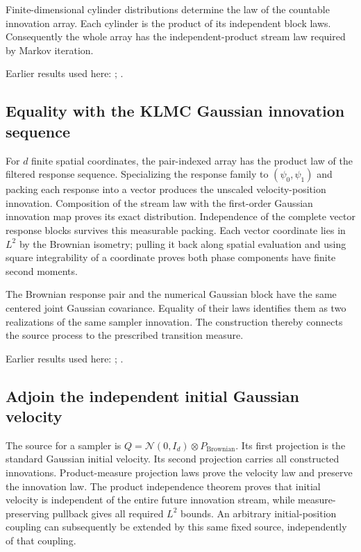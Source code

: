 \documentclass[11pt,a4paper]{report}
\begin{document}
Finite-dimensional cylinder distributions determine the law of the countable innovation array. Each cylinder is the product of its independent block laws. Consequently the whole array has the independent-product stream law required by Markov iteration.



Earlier results used here: \cite[Section~3.8.16]{LangevinLean2026ULASC}; \cite[Section~3.8.17]{LangevinLean2026ULASC}.
\subsection{\texorpdfstring{Equality with the KLMC Gaussian innovation sequence}{Equality with the KLMC Gaussian innovation sequence}}
\label{report-step-KineticLangevin-CanonicalVectorSegments-lean-4}


For \(d\) finite spatial coordinates, the pair-indexed array has the product law of the filtered response sequence. Specializing the response family to \((\psi_0,\psi_1)\) and packing each response into a vector produces the unscaled velocity-position innovation. Composition of the stream law with the first-order Gaussian innovation map proves its exact distribution. Independence of the complete vector response blocks survives this measurable packing. Each vector coordinate lies in \(L^{2}\) by the Brownian isometry; pulling it back along spatial evaluation and using square integrability of a coordinate proves both phase components have finite second moments.



The Brownian response pair and the numerical Gaussian block have the same centered joint Gaussian covariance. Equality of their laws identifies them as two realizations of the same sampler innovation. The construction thereby connects the source process to the prescribed transition measure.



Earlier results used here: \cite[Section~3.8.16]{LangevinLean2026ULASC}; \cite[Section~3.8.17]{LangevinLean2026ULASC}.
\subsection{\texorpdfstring{Adjoin the independent initial Gaussian velocity}{Adjoin the independent initial Gaussian velocity}}
\label{report-step-KineticLangevin-CanonicalVectorSegments-lean-5}


The source for a sampler is \(Q=\mathcal N(0,I_d)\otimes P_{\mathrm{Brownian}}\). Its first projection is the standard Gaussian initial velocity. Its second projection carries all constructed innovations. Product-measure projection laws prove the velocity law and preserve the innovation law. The product independence theorem proves that initial velocity is independent of the entire future innovation stream, while measure-preserving pullback gives all required \(L^{2}\) bounds. An arbitrary initial-position coupling can subsequently be extended by this same fixed source, independently of that coupling.
\end{document}
